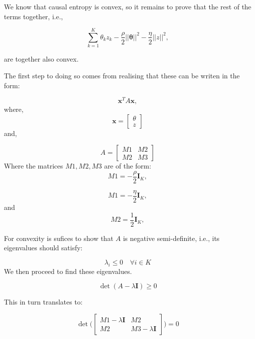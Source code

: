 \documentclass{aamas2016}
\begin{document}
We know that causal entropy is convex, so it remains to prove that the rest of the terms together, i.e.,

\begin{equation}
\sum_{k=1}^K \theta_k z_k - \frac{\rho}{2}||\mathbf{\theta}||^2 - \frac{\eta}{2}||z||^2,
\end{equation}

 are together also convex.

The first step to doing so comes from realising that these can be writen in the form:

\begin{equation}
	\mathbf{x}^TA\mathbf{x},
\end{equation}
where,
\begin{equation}
	\mathbf{x} =  \begin{bmatrix} \theta \\ z \end{bmatrix}
\end{equation}
and,

\begin{equation}
  A = \begin{bmatrix} M1 & M2 \\ M2 & M3 \end{bmatrix} 
\end{equation}
Where the matrices $M1, M2, M3$ are of the form:
\begin{equation}
	M1 = -\frac{\rho}{2}\mathbf{I}_K,
\end{equation}

\begin{equation}
	M1 = -\frac{\eta}{2}\mathbf{I}_K,
\end{equation}
and
\begin{equation}
	M2 = \frac{1}{2}\mathbf{I}_K,
\end{equation}

For convexity is sufices to show that $A$ is negative semi-definite, i.e.,
its eigenvalues should satisfy:

\begin{equation}
	\lambda_i \leq 0 \quad \forall i \in K
\end{equation}
We then proceed to find these eigenvalues.

\begin{equation}
\det(A-\lambda\mathbf{I}) \geq 0
\end{equation}

This in turn translates to:

\begin{equation}
\det \Big( \begin{bmatrix} M1 - \lambda\mathbf{I} & M2 \\ M2 & M3- \lambda\mathbf{I} \end{bmatrix} \Big) = 0
\end{equation}
\end{document}
